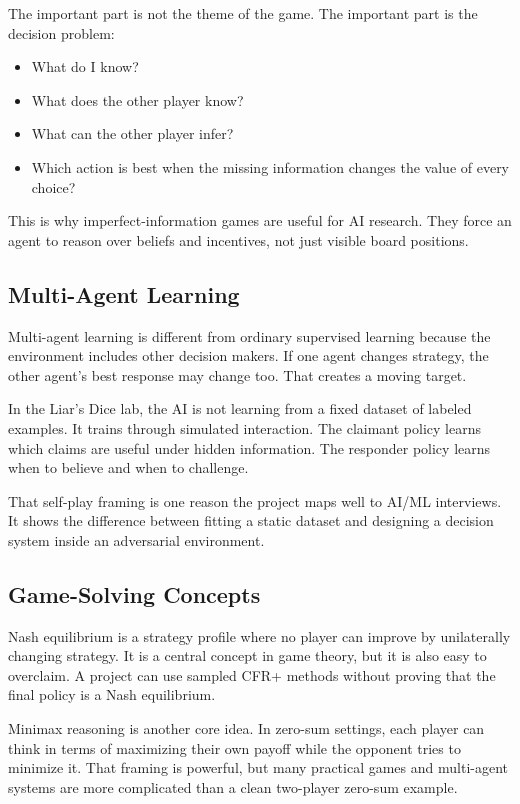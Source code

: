 \documentclass[
]{article}
\providecommand{\tightlist}{%
  \setlength{\itemsep}{0pt}\setlength{\parskip}{0pt}}
\begin{document}
The important part is not the theme of the game. The important part is
the decision problem:

\begin{itemize}
\tightlist
\item
  What do I know?
\item
  What does the other player know?
\item
  What can the other player infer?
\item
  Which action is best when the missing information changes the value of
  every choice?
\end{itemize}

This is why imperfect-information games are useful for AI research. They
force an agent to reason over beliefs and incentives, not just visible
board positions.

\subsection{Multi-Agent Learning}\label{multi-agent-learning}

Multi-agent learning is different from ordinary supervised learning
because the environment includes other decision makers. If one agent
changes strategy, the other agent's best response may change too. That
creates a moving target.

In the Liar's Dice lab, the AI is not learning from a fixed dataset of
labeled examples. It trains through simulated interaction. The claimant
policy learns which claims are useful under hidden information. The
responder policy learns when to believe and when to challenge.

That self-play framing is one reason the project maps well to AI/ML
interviews. It shows the difference between fitting a static dataset and
designing a decision system inside an adversarial environment.

\subsection{Game-Solving Concepts}\label{game-solving-concepts}

Nash equilibrium is a strategy profile where no player can improve by
unilaterally changing strategy. It is a central concept in game theory,
but it is also easy to overclaim. A project can use sampled CFR+ methods
without proving that the final policy is a Nash equilibrium.

Minimax reasoning is another core idea. In zero-sum settings, each
player can think in terms of maximizing their own payoff while the
opponent tries to minimize it. That framing is powerful, but many
practical games and multi-agent systems are more complicated than a
clean two-player zero-sum example.
\end{document}
